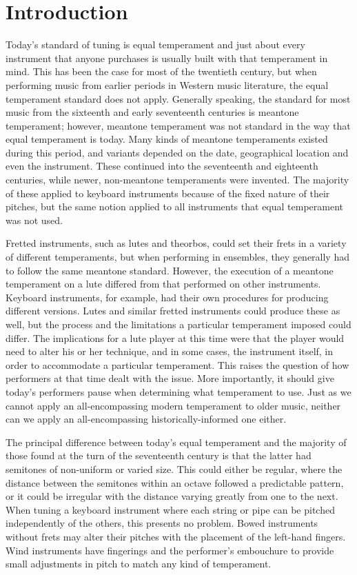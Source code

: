 \chapter*{Introduction}

Today's standard of tuning is equal temperament and just about every instrument
that anyone purchases is usually built with that temperament in mind.  This has
been the case for most of the twentieth century, but when performing music from
earlier periods in Western music literature, the equal temperament standard does
not apply.  Generally speaking, the standard for most music from the sixteenth
and early seventeenth centuries is meantone temperament; however, meantone
temperament was not standard in the way that equal temperament is today.  Many
kinds of meantone temperaments existed during this period, and variants depended
on the date, geographical location and even the instrument.  These continued
into the seventeenth and eighteenth centuries, while newer, non-meantone
temperaments were invented.  The majority of these applied to keyboard
instruments because of the fixed nature of their pitches, but the same notion
applied to all instruments that equal temperament was not used.

Fretted instruments, such as lutes and theorbos, could set their frets in a
variety of different temperaments, but when performing in ensembles, they
generally had to follow the same meantone standard.  However, the execution of a
meantone temperament on a lute differed from that performed on other
instruments. Keyboard instruments, for example, had their own procedures for
producing different versions.  Lutes and similar fretted instruments could
produce these as well, but the process and the limitations a particular
temperament imposed could differ. The implications for a lute player at this
time were that the player would need to alter his or her technique, and in some
cases, the instrument itself, in order to accommodate a particular temperament.
This raises the question of how performers at that time dealt with the issue.
More importantly, it should give today's performers pause when determining what
temperament to use.  Just as we cannot apply an all-encompassing modern
temperament to older music, neither can we apply an all-encompassing
historically-informed one either.

The principal difference between today's equal temperament and the majority of
those found at the turn of the seventeenth century is that the latter had
semitones of non-uniform or varied size.  This could either be regular, where
the distance between the semitones within an octave followed a predictable
pattern, or it could be irregular with the distance varying greatly from one to
the next. When tuning a keyboard instrument where each string or pipe can be
pitched independently of the others, this presents no problem.  Bowed
instruments without frets may alter their pitches with the placement of the
left-hand fingers.  Wind instruments have fingerings and the performer's
embouchure to provide small adjustments in pitch to match any kind of
temperament.

